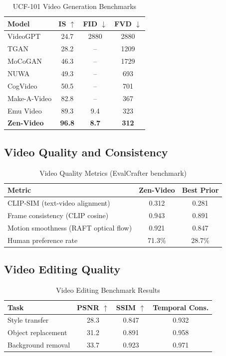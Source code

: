 \documentclass[11pt,a4paper]{article}
\begin{document}
\begin{table}[H]
\centering
\begin{tabular}{lccc}
\toprule
\textbf{Model} & \textbf{IS} $\uparrow$ & \textbf{FID} $\downarrow$ & \textbf{FVD} $\downarrow$ \\
\midrule
VideoGPT & 24.7 & 2880 & 2880 \\
TGAN & 28.2 & -- & 1209 \\
MoCoGAN & 46.3 & -- & 1729 \\
NUWA & 49.3 & -- & 693 \\
CogVideo & 50.5 & -- & 701 \\
Make-A-Video & 82.8 & -- & 367 \\
Emu Video & 89.3 & 9.4 & 323 \\
\textbf{Zen-Video} & \textbf{96.8} & \textbf{8.7} & \textbf{312} \\
\bottomrule
\end{tabular}
\caption{UCF-101 Video Generation Benchmarks}
\end{table}

\subsection{Video Quality and Consistency}

\begin{table}[H]
\centering
\begin{tabular}{lcc}
\toprule
\textbf{Metric} & \textbf{Zen-Video} & \textbf{Best Prior} \\
\midrule
CLIP-SIM (text-video alignment) & 0.312 & 0.281 \\
Frame consistency (CLIP cosine) & 0.943 & 0.891 \\
Motion smoothness (RAFT optical flow) & 0.921 & 0.847 \\
Human preference rate & 71.3\% & 28.7\% \\
\bottomrule
\end{tabular}
\caption{Video Quality Metrics (EvalCrafter benchmark)}
\end{table}

\subsection{Video Editing Quality}

\begin{table}[H]
\centering
\begin{tabular}{lccc}
\toprule
\textbf{Task} & \textbf{PSNR} $\uparrow$ & \textbf{SSIM} $\uparrow$ & \textbf{Temporal Cons.} \\
\midrule
Style transfer & 28.3 & 0.847 & 0.932 \\
Object replacement & 31.2 & 0.891 & 0.958 \\
Background removal & 33.7 & 0.923 & 0.971 \\
\bottomrule
\end{tabular}
\caption{Video Editing Benchmark Results}
\end{table}
\end{document}

